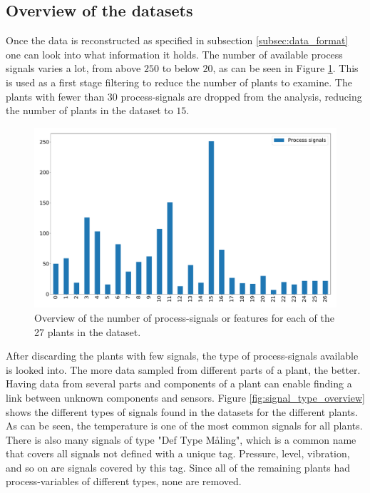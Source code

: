         
    \subsection{Overview of the datasets}
        Once the data is reconstructed as specified in subsection \ref{subsec:data_format} one can look into what information it holds. The number of available process signals varies a lot, from above $250$ to below $20$, as can be seen in Figure \ref{fig:process_signal_overview}. This is used as a first stage filtering to reduce the number of plants to examine. The plants with fewer than $30$ process-signals are dropped from the analysis, reducing the number of plants in the dataset to $15$.    
        
        \begin{figure}[h]
            \centering
            \includegraphics[width=\textwidth]{report/figures/data/plant_process_signals_overview.pdf}
            \caption{Overview of the number of process-signals or features for each of the 27 plants in the dataset.}
            \label{fig:process_signal_overview}
        \end{figure}
        
        After discarding the plants with few signals, the type of process-signals available is looked into. The more data sampled from different parts of a plant, the better. Having data from several parts and components of a plant can enable finding a link between unknown components and sensors. Figure \ref{fig:signal_type_overview} shows the different types of signals found in the datasets for the different plants. As can be seen, the temperature is one of the most common signals for all plants. There is also many signals of type "Def Type Måling", which is a common name that covers all signals not defined with a unique tag. Pressure, level, vibration, and so on are signals covered by this tag. Since all of the remaining plants had process-variables of different types, none are removed. 
        
